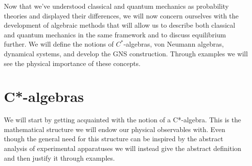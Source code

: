 Now that we've understood classical and quantum mechanics as probability theories and displayed their differences, we will now concern ourselves with the development of algebraic methods that will allow us to describe both classical and quantum mechanics in the same framework and to discuss equilibrium further. We will define the notions of $C^*$-algebras, von Neumann algebras, dynamical systems, and develop the GNS construction. Through examples we will see the physical importance of these concepts. 
 
\section{C*-algebras}

We will start by getting acquainted with the notion of a C*-algebra. This is the mathematical structure we will endow our physical observables with. Even though the general need for this structure can be inspired by the abstract analysis of experimental apparatuses\cite{Strocchi2008a} we will instead give the abstract definition and then justify it through examples. 

